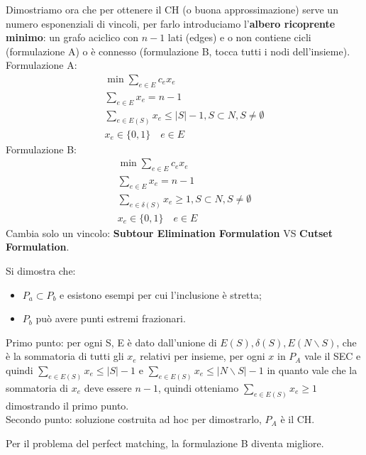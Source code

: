 Dimostriamo ora che per ottenere il CH (o buona approssimazione) serve un numero esponenziali di vincoli, per farlo introduciamo l'\textbf{albero ricoprente minimo}: un grafo aciclico con $n-1$ lati (edges) e o non contiene cicli (formulazione A) o è connesso (formulazione B, tocca tutti i nodi dell'insieme).
Formulazione A:
\begin{equation}
	\begin{aligned}
		\min \sum_{e\in E}c_ex_e\\
		\sum_{e\in E}x_e=n-1\\
		\sum_{e\in E(S)}x_e\le |S|-1, S\subset N, S\neq \emptyset \\
		x_e\in \{0,1\} \quad e\in E
	\end{aligned}
\end{equation}
Formulazione B:
\begin{equation}
	\begin{aligned}
		\min \sum_{e\in E}c_ex_e\\
		\sum_{e\in E}x_e=n-1\\
		\sum_{e\in \delta(S)}x_e\ge 1, S\subset N, S\neq \emptyset \\
		x_e\in \{0,1\} \quad e\in E
	\end{aligned}
\end{equation}
Cambia solo un vincolo: \textbf{Subtour Elimination Formulation} VS \textbf{Cutset Formulation}. 

Si dimostra che:
\begin{itemize}
	\item $P_a\subset P_b$ e esistono esempi per cui l'inclusione è stretta;
	\item $P_b$ può avere punti estremi frazionari.
\end{itemize}
Primo punto: per ogni S, E è dato dall'unione di $E(S), \delta (S), E(N\backslash S)$, che è la sommatoria di tutti gli $x_e$ relativi per insieme, per ogni $x$ in $P_A$ vale il SEC e quindi $\sum_{e\in E(S)}x_e\le |S|-1$ e $\sum_{e\in E(S)}x_e\le |N\backslash S|-1$ in quanto vale che la sommatoria di $x_e$ deve essere $n-1$, quindi otteniamo $\sum_{e\in E(S)}x_e\ge 1$ dimostrando il primo punto.\\
Secondo punto: soluzione costruita ad hoc per dimostrarlo, $P_A$ è il CH.

Per il problema del perfect matching, la formulazione B diventa migliore.